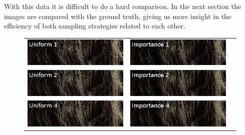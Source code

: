 \documentclass[11pt,a4paper]{report}
\begin{document}
With this data it is difficult to do a hard comparison. In the next section the images are compared with the ground truth, giving us more insight in the efficiency of both sampling strategies related to each other.  


\begin{figure}
\begin{center}
\bgroup
\setlength{\tabcolsep}{0.0em} %
\def\arraystretch{0.0}%
\begin{tabular}{ccc}
\includegraphics[scale=0.6]{variance-results/un1.png} & \includegraphics[scale=0.6]{variance-results/is1.png} \\ \includegraphics[scale=0.6]{variance-results/un2.png} & \includegraphics[scale=0.6]{variance-results/is2.png} \\
\includegraphics[scale=0.6]{variance-results/un4.png} & \includegraphics[scale=0.6]{variance-results/is4.png} \\

\end{tabular}
\end{center}
\end{figure}
\end{document}
